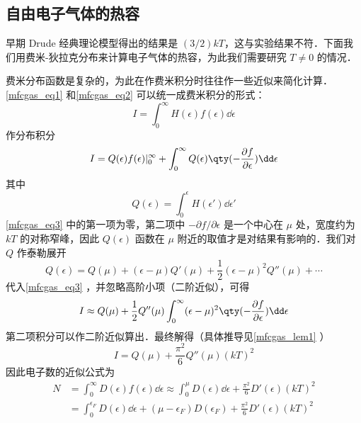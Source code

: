 \subsection{自由电子气体的热容}
早期 Drude 经典理论模型得出的结果是 $(3/2)k T$，这与实验结果不符．下面我们用费米-狄拉克分布来计算电子气体的热容，为此我们需要研究 $T\neq 0$ 的情况．

费米分布函数是复杂的，为此在作费米积分时往往作一些近似来简化计算．\autoref{mfcgas_eq1} 和\autoref{mfcgas_eq2} 可以统一成费米积分的形式：
\begin{equation}
I=\int_0^\infty H(\epsilon)f(\epsilon)\dd\epsilon
\end{equation}
作分布积分
\begin{equation}\label{mfcgas_eq3}
I=Q(\epsilon)f(\epsilon)|_0^\infty + \int_0^\infty Q(\epsilon)\qty(-\frac{\partial f}{\partial\epsilon})\dd \epsilon
\end{equation}
其中
\begin{equation}
Q(\epsilon)=\int_0^\epsilon H(\epsilon')\dd\epsilon'
\end{equation}
\autoref{mfcgas_eq3} 中的第一项为零，第二项中 $-\partial f/\partial \epsilon$ 是一个中心在 $\mu$ 处，宽度约为 $kT$ 的对称窄峰，因此 $Q(\epsilon)$ 函数在 $\mu$ 附近的取值才是对结果有影响的．我们对 $Q$ 作泰勒展开
\begin{equation}
Q(\epsilon)=Q(\mu)+(\epsilon-\mu)Q'(\mu)+\frac{1}{2}(\epsilon-\mu)^2 Q''(\mu)+\cdots
\end{equation}
代入\autoref{mfcgas_eq3} ，并忽略高阶小项（二阶近似），可得
\begin{equation}
I\approx Q(\mu)+\frac{1}{2}Q''(\mu)\int_0^\infty (\epsilon-\mu)^2 \qty(-\frac{\partial f}{\partial \epsilon})\dd\epsilon
\end{equation}
第二项积分可以作二阶近似算出．最终解得（具体推导见\autoref{mfcgas_lem1} ）
\begin{equation}
I=Q(\mu)+\frac{\pi^2}{6}Q''(\mu)(k T)^2
\end{equation}
因此电子数的近似公式为
\begin{equation}
\begin{aligned}
N&=\int_0^\infty D(\epsilon) f(\epsilon) \dd\epsilon \approx 
\int_0^\mu D(\epsilon) \dd \epsilon + \frac{\pi^2}{6}D'(\epsilon)(kT)^2\\
&=\int_0^{\epsilon_F} D(\epsilon)\dd\epsilon+(\mu-\epsilon_F) D(\epsilon_F) + \frac{\pi^2}{6}D'(\epsilon)(kT)^2
\end{aligned}
\end{equation}

